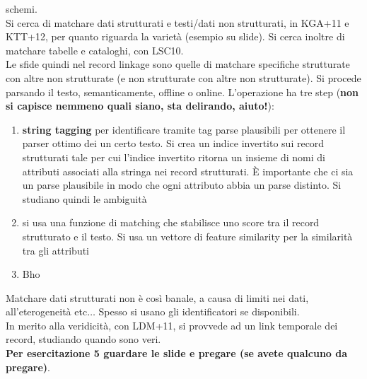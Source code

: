 \documentclass[a4paper,12pt, oneside]{book}
\begin{document}
schemi.\\
Si cerca di matchare dati strutturati e testi/dati non strutturati, in
KGA+11 e KTT+12, per quanto riguarda la varietà (esempio su slide). Si cerca
inoltre di matchare tabelle e cataloghi, con LSC10. \\
Le sfide quindi nel record linkage sono
quelle di matchare specifiche strutturate con altre non strutturate (e non
strutturate con altre non strutturate). Si procede parsando il testo,
semanticamente, offline o online. L'operazione ha tre step (\textbf{non si
  capisce nemmeno quali siano, sta delirando, aiuto!}):
\begin{enumerate}
  \item \textbf{string tagging} per identificare tramite tag parse plausibili
  per ottenere il parser ottimo dei un certo testo. Si crea un indice invertito
  sui record strutturati tale per cui l'indice invertito ritorna un insieme di
  nomi di attributi associati alla stringa nei record strutturati. È importante
  che ci sia un parse plausibile in modo che ogni attributo abbia un parse
  distinto. Si studiano quindi le ambiguità
  \item si usa una funzione di matching che stabilisce uno score tra il record
  strutturato e il testo. Si usa un vettore di feature similarity per la
  similarità tra gli attributi
  \item Bho
\end{enumerate}
Matchare dati strutturati non è così banale, a causa di limiti nei dati,
all'eterogeneità etc$\ldots$ Spesso si usano gli identificatori se
disponibili.\\
In merito alla veridicità, con LDM+11, si provvede ad un link temporale dei
record, studiando quando sono veri. \\
\textbf{Per esercitazione 5 guardare le slide e pregare (se avete qualcuno da
  pregare)}. 
\end{document}
